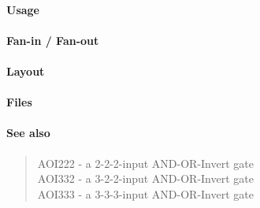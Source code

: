 \paragraph{Usage}

\paragraph{Fan-in / Fan-out}

\paragraph{Layout}

\paragraph{Files}

\paragraph{See also}
\begin{quote}
    AOI222 - a 2-2-2-input AND-OR-Invert gate \\
    AOI332 - a 3-2-2-input AND-OR-Invert gate \\
    AOI333 - a 3-3-3-input AND-OR-Invert gate
\end{quote}
